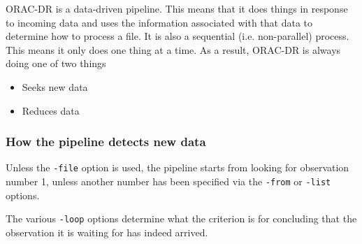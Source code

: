 \documentclass[twoside,11pt]{article}
\renewcommand{\_}{\texttt{\symbol{95}}}
\begin{document}
ORAC-DR is a data-driven pipeline. This means that it does things in
response to incoming data and uses the information associated with
that data to determine how to process a file. It is also a sequential
(i.e. non-parallel) process. This means it only does one thing at a
time. As a result, ORAC-DR is always doing one of two things

\begin{itemize}

\item

Seeks new data


\item

Reduces data

\end{itemize}
\subsubsection*{How the pipeline detects new data\label{The_ORAC-DR_Data_Loops_How_the_pipeline_detects_new_data}}


Unless the \texttt{-file} option is used, the pipeline starts from looking for observation number 1, unless another number has been specified via the
\texttt{-from} or \texttt{-list} options.



The various \texttt{-loop} options determine what the criterion is for
concluding that the observation it is waiting for has indeed arrived.
\end{document}
